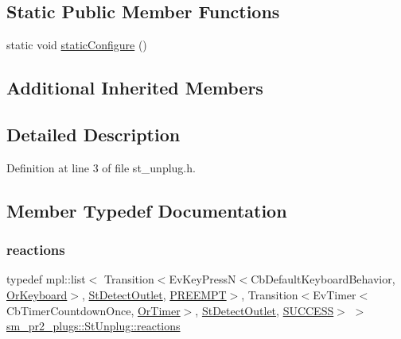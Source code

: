 \subsection*{Static Public Member Functions}
\begin{DoxyCompactItemize}
\item 
static void \hyperlink{structsm__pr2__plugs_1_1StUnplug_aef539ea0c8d9ebf2ee46a69ca5db75be}{static\+Configure} ()
\end{DoxyCompactItemize}
\subsection*{Additional Inherited Members}


\subsection{Detailed Description}


Definition at line 3 of file st\+\_\+unplug.\+h.



\subsection{Member Typedef Documentation}
\mbox{\label{structsm__pr2__plugs_1_1StUnplug_a5e2311ff9af5d5f6391dc9bec1cb477f}} 
\subsubsection{\texorpdfstring{reactions}{reactions}}
{\footnotesize\ttfamily typedef mpl\+::list$<$ Transition$<$Ev\+Key\+PressN$<$Cb\+Default\+Keyboard\+Behavior, \hyperlink{classsm__pr2__plugs_1_1OrKeyboard}{Or\+Keyboard}$>$, \hyperlink{structsm__pr2__plugs_1_1StDetectOutlet}{St\+Detect\+Outlet}, \hyperlink{classPREEMPT}{P\+R\+E\+E\+M\+PT}$>$, Transition$<$Ev\+Timer$<$Cb\+Timer\+Countdown\+Once, \hyperlink{classsm__pr2__plugs_1_1OrTimer}{Or\+Timer}$>$, \hyperlink{structsm__pr2__plugs_1_1StDetectOutlet}{St\+Detect\+Outlet}, \hyperlink{classSUCCESS}{S\+U\+C\+C\+E\+SS}$>$ $>$ \hyperlink{structsm__pr2__plugs_1_1StUnplug_a5e2311ff9af5d5f6391dc9bec1cb477f}{sm\+\_\+pr2\+\_\+plugs\+::\+St\+Unplug\+::reactions}}



